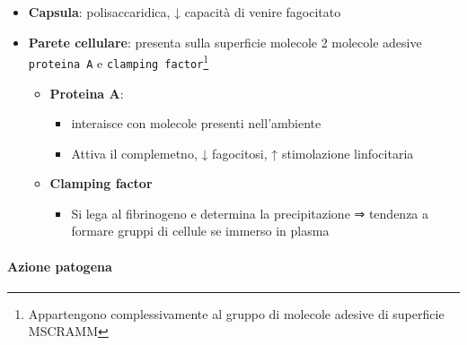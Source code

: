 \documentclass[italian,]{article}
\providecommand{\tightlist}{%
  \setlength{\itemsep}{0pt}\setlength{\parskip}{0pt}}
\begin{document}
\begin{itemize}
\tightlist
\item
  \textbf{Capsula}: polisaccaridica, ↓ capacità di venire fagocitato
\item
  \textbf{Parete cellulare}: presenta sulla superficie molecole 2
  molecole adesive \texttt{proteina\ A} e
  \texttt{clamping\ factor}\footnote{Appartengono complessivamente al
    gruppo di molecole adesive di superficie MSCRAMM}

  \begin{itemize}
  \tightlist
  \item
    \textbf{Proteina A}:

    \begin{itemize}
    \tightlist
    \item
      interaisce con molecole presenti nell'ambiente
    \item
      Attiva il complemetno, ↓ fagocitosi, ↑ stimolazione linfocitaria
    \end{itemize}
  \item
    \textbf{Clamping factor}

    \begin{itemize}
    \tightlist
    \item
      Si lega al fibrinogeno e determina la precipitazione ⇒ tendenza a
      formare gruppi di cellule se immerso in plasma
    \end{itemize}
  \end{itemize}
\end{itemize}

\hypertarget{azione-patogena}{%
\paragraph{Azione patogena}\label{azione-patogena}}
\end{document}
